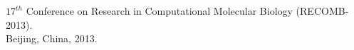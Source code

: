 \begin{outerlist}
       $17^{th}$ Conference on Research in Computational Molecular Biology (RECOMB-2013).\\
       Beijing, China, 2013.
\end{outerlist}
